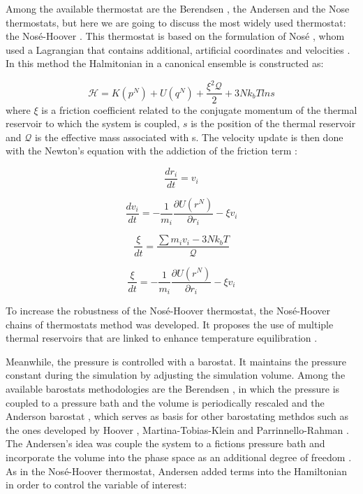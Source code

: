 Among the available thermostat are the Berendsen \cite{doi:10.1063/1.448118}, the Andersen \cite{1980JChPh722384A} and the Nose \cite{1984JChPh81511N} thermostats, but here we are going to discuss the most widely used thermostat: the Nosé-Hoover \cite{PhysRevA.31.1695}. This thermostat is based on the formulation of Nosé \cite{1984JChPh81511N}, whom used a Lagrangian that contains additional, artificial coordinates and velocities \cite{frenkel}. In this method the Halmitonian in a canonical ensemble is constructed as:

\begin{equation}
\mathcal{H} =  K(p^{N}) + U(q^{N})  + \frac{\xi ^{2} \mathcal{Q}}{2} + 3Nk_{b}T ln s
\end{equation}
where $\xi$ is a friction coefficient related to the conjugate momentum of the thermal reservoir to which the system is coupled, $s$ is the position of the thermal reservoir and $\mathcal{Q}$ is the effective mass associated with s. The velocity update is then done with the Newton's equation with the addiction of the friction term \cite{shell2015}:

\begin{equation}
\frac{dr_{i}}{dt} = v_{i}
\end{equation}

\begin{equation}
\frac{dv_{i}}{dt} = - \frac{1}{m_{i}} \frac{\partial U (r^{N})}{\partial r_{i}} - \xi v_{i}
\end{equation}

\begin{equation}
\frac{\xi}{dt} = \frac{\sum m_{i} v_{i} - 3Nk_{b}T}{\mathcal{Q}} 
\end{equation}

\begin{equation}
\frac{\xi}{dt} = - \frac{1}{m_{i}} \frac{\partial U (r^{N})}{\partial r_{i}} - \xi v_{i}
\end{equation}

To increase the robustness of the Nosé-Hoover thermostat, the Nosé-Hoover chains of thermostats method was developed. It proposes the use of multiple thermal reservoirs that are linked to enhance temperature equilibration \cite{shell2015}.  

Meanwhile, the pressure is controlled with a barostat. It maintains the pressure constant during the simulation by adjusting the simulation volume. Among the available  barostats methodologies are the Berendsen \cite{doi:10.1063/1.448118}, in which the pressure is coupled to a pressure bath and the volume is periodically rescaled and the Anderson barostat \cite{1980JChPh722384A}, which serves as basis for other barostating methdos such as the ones developed by Hoover \cite{PhysRevA.31.1695}, Martina-Tobias-Klein \cite{doi:10.1063/1.467468} and Parrinnello-Rahman \cite{doi:10.1063/1.328693}. The Andersen's idea was couple the system to a fictions pressure bath and  incorporate the volume into the phase space as an additional degree of freedom \cite{tuckerman}. As in the Nosé-Hoover thermostat, Andersen added terms into the Hamiltonian in order to control the variable of interest:

